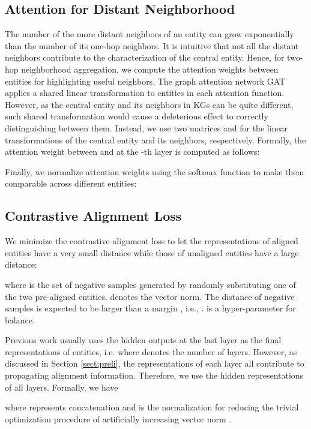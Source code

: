 \documentclass[letterpaper]{article} \usepackage{aaai20}  \usepackage{times}  \usepackage{helvet} \usepackage{courier}  \usepackage[hyphens]{url}  \usepackage{graphicx} \urlstyle{rm} \def\UrlFont{\rm}  \frenchspacing  \setlength{\pdfpagewidth}{8.5in}  \setlength{\pdfpageheight}{11in}  \usepackage{amsmath}
\begin{document}
\subsection{Attention for Distant Neighborhood}
The number of the more distant neighbors of an entity can grow exponentially than the number of its one-hop neighbors. It is intuitive that not all the distant neighbors contribute to the characterization of the central entity. Hence, for two-hop neighborhood aggregation, we compute the attention weights between entities for highlighting useful neighbors. The graph attention network GAT \cite{GAT} applies a shared linear transformation to entities in each attention function. However, as the central entity and its neighbors in KGs can be quite different, such shared transformation would cause a deleterious effect to correctly distinguishing between them. Instead, we use two matrices  and  for the linear transformations of the central entity and its neighbors, respectively. Formally, the attention weight  between  and  at the -th layer is computed as follows:

Finally, we normalize attention weights using the softmax function to make them comparable across different entities:


\subsection{Contrastive Alignment Loss}
We minimize the contrastive alignment loss to let the representations of aligned entities have a very small distance while those of unaligned entities have a large distance: 

where  is the set of negative samples generated by randomly substituting one of the two pre-aligned entities.  denotes the  vector norm.  The distance of negative samples is expected to be larger than a margin , i.e., .  is a hyper-parameter for balance.
	
Previous work usually uses the hidden outputs at the last layer as the final representations of entities, i.e.  where  denotes the number of layers. However, as discussed in Section \ref{sect:preli}, the representations of each layer all contribute to propagating alignment information. Therefore, we use the hidden representations of all layers. Formally, we have

where  represents concatenation and  is the  normalization for reducing the trivial optimization procedure of artificially increasing vector norm \cite{TransE}.
\end{document}
